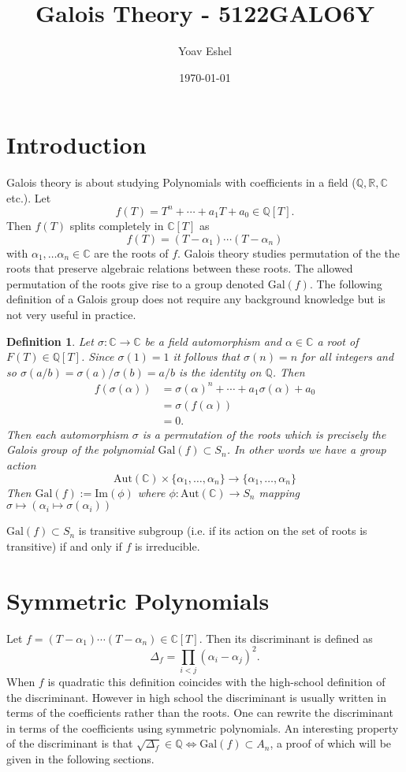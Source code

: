 \documentclass{article}
\title{Galois Theory - 5122GALO6Y}
\author{Yoav Eshel}
\date{\today}
\newcommand{\R}{\mathbb{R}}
\newcommand{\C}{\mathbb{C}}
\newcommand{\Q}{\mathbb{Q}}
\newtheorem*{definition}{Definition}
\theoremstyle{remark}
\begin{document}
    \maketitle
    \tableofcontents
    \newpage
    \section{Introduction}
    Galois theory is about studying Polynomials with coefficients in a field ($\Q,\R,\C$ etc.).
    Let
    $$
        f(T) = T^n+\cdots+a_1T+a_0\in\Q[T].
    $$
    Then $f(T)$ splits completely in $\C[T]$ as
    $$
        f(T)=(T-\alpha_1)\cdots(T-\alpha_n)
    $$
    with $\alpha_1,\dots \alpha_n\in\C$ are the roots of $f$. Galois theory studies permutation of the the roots that preserve algebraic relations between these roots.
    The allowed permutation of the roots give rise to a group denoted $\text{Gal}(f)$.
    The following definition of a Galois group does not require any background knowledge but is not very useful in practice.

    \begin{definition}
        Let $\sigma:\C\to\C$ be a field automorphism and $\alpha\in\C$ a root of $F(T)\in\Q[T]$. Since $\sigma(1)=1$ it follows that $\sigma(n)=n$ for all integers and so $\sigma(a/b)=\sigma(a)/\sigma(b)=a/b$ is the identity on $\Q$.
        Then
        \begin{align*}
            f(\sigma(\alpha))&=\sigma(\alpha)^n+\cdots+a_1\sigma(\alpha)+a_0\\
            &=\sigma(f(\alpha))\\
            &=0.
        \end{align*}
        Then each automorphism $\sigma$ is a permutation of the roots which is precisely the Galois group of the polynomial $\text{Gal}(f)\subset S_n$.
        In other words we have a group action 
        $$
        \text{Aut}(\C)\times\{\alpha_1,\dots,\alpha_n\}\to\{\alpha_1,\dots,\alpha_n\}
        $$
        Then $\text{Gal}(f):=\text{Im}(\phi)$ where $\phi:\text{Aut}(\C)\to S_n$ mapping $\sigma\mapsto(\alpha_i\mapsto \sigma(\alpha_i))$
    \end{definition}

    $\text{Gal}(f)\subset S_n$ is transitive subgroup (i.e. if its action on the set of roots is transitive) if and only if $f$ is irreducible.
    
    \section{Symmetric Polynomials}
    Let $f=(T-\alpha_1)\cdots(T-\alpha_n)\in\C[T]$. Then its discriminant is defined as
    $$
        \Delta_f = \prod_{i<j}(\alpha_i-\alpha_j)^2.
    $$
    When $f$ is quadratic this definition coincides with the high-school definition of the discriminant. 
    However in high school the discriminant is usually written in terms of the coefficients rather than the roots.
    One can rewrite the discriminant in terms of the coefficients using symmetric polynomials. 
    An interesting property of the discriminant is that $\sqrt{\Delta_f}\in\Q\iff \text{Gal}(f)\subset A_n$, a proof of which will be given in the following sections.
\end{document}
